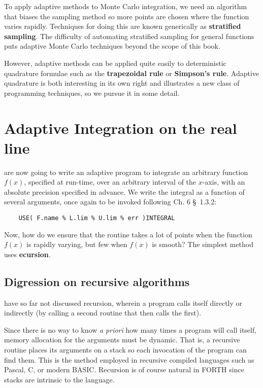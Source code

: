 To apply adaptive methods to Monte Carlo integration, we need an algorithm that biases the sampling method so more points are chosen where the function varies rapidly. Techniques for doing this are known generically as \textbf{stratified sampling}. The difficulty of automating stratified sampling for general functions puts adaptive Monte Carlo techniques beyond the scope of this book.

However, adaptive methods can be applied quite easily to deterministic quadrature formulae such as the \textbf{trapezoidal rule} or \textbf{Simpson’s rule}. Adaptive quadrature is both interesting in its own right and illustrates a new class of programming techniques, so we pursue it in some detail.

\section{Adaptive Integration on the real line}
 are now going to write an adaptive program to integrate an arbitrary function $f(x)$, specified at run-time, over an arbitrary interval of the $x$-axis, with an absolute precision specified in advance. We write the integral as a function of several arguments, once again to be invoked following Ch. 6 \S\ 1.3.2:

\begin{lstlisting}
    USE( F.name % L.lim % U.lim % err )INTEGRAL
\end{lstlisting}

Now, how do we ensure that the routine takes a lot of points when the function $f(x)$ is rapidly varying, but few when $f(x)$ is smooth? The simplest method uses \textbf{ecursion}.

\subsection{Digression on recursive algorithms}
 have so far not discussed recursion, wherein a program calls itself directly or indirectly (by calling a second routine that then calls the first).

Since there is no way to know \textit{a priori} how many times a program will call itself, memory allocation for the arguments must be dynamic. That is, a recursive routine places its arguments on a stack so each invocation of the program can find them. This is the method employed in recursive compiled languages such as Pascal, C, or modern BASIC. Recursion is of course natural in FORTH since stacks are intrinsic to the language.

